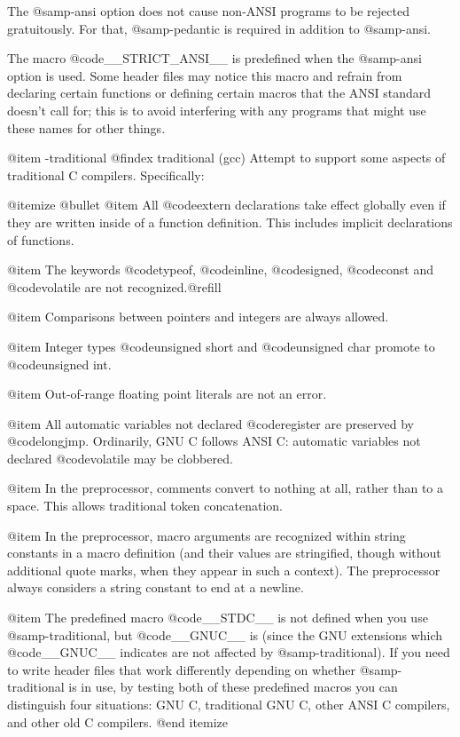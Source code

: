 {The @samp{-ansi} option does not cause non-ANSI programs to be
rejected gratuitously. For that, @samp{-pedantic} is required in
addition to @samp{-ansi}.

The macro @code{__STRICT_ANSI__} is predefined when the @samp{-ansi}
option is used.  Some header files may notice this macro and refrain
from declaring certain functions or defining certain macros that the
ANSI standard doesn't call for; this is to avoid interfering with
any programs that might use these names for other things.

@item -traditional
@findex traditional (gcc)
Attempt to support some aspects of traditional C compilers.
Specifically:

@itemize @bullet
@item
All @code{extern} declarations take effect globally even if they
are written inside of a function definition.  This includes implicit
declarations of functions.

@item
The keywords @code{typeof}, @code{inline}, @code{signed}, @code{const}
and @code{volatile} are not recognized.@refill

@item
Comparisons between pointers and integers are always allowed.

@item
Integer types @code{unsigned short} and @code{unsigned char} promote
to @code{unsigned int}.

@item
Out-of-range floating point literals are not an error.

@item
All automatic variables not declared @code{register} are preserved by
@code{longjmp}. Ordinarily, GNU C follows ANSI C: automatic variables
not declared @code{volatile} may be clobbered.

@item
In the preprocessor, comments convert to nothing at all, rather than
to a space. This allows traditional token concatenation.

@item
In the preprocessor, macro arguments are recognized within string
constants in a macro definition (and their values are stringified,
though without additional quote marks, when they appear in such a
context). The preprocessor always considers a string constant to end
at a newline.

@item
The predefined macro @code{__STDC__} is not defined when you use
@samp{-traditional}, but @code{__GNUC__} is (since the GNU extensions
which @code{__GNUC__} indicates are not affected by
@samp{-traditional}).  If you need to write header files that work
differently depending on whether @samp{-traditional} is in use, by
testing both of these predefined macros you can distinguish four
situations: GNU C, traditional GNU C, other ANSI C compilers, and
other old C compilers.
@end itemize

}
